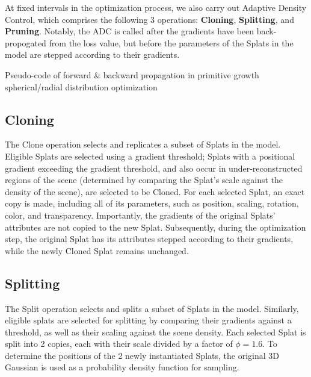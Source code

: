 \documentclass[11pt]{report}
\begin{document}
At fixed intervals in the optimization process, we also carry out Adaptive Density Control, which comprises the following 3 operations: \textbf{Cloning}, \textbf{Splitting}, and \textbf{Pruning}. Notably, the ADC is called after the gradients have been back-propogated from the loss value, but before the parameters of the Splats in the model are stepped according to their gradients.

\begin{center} %
    \begin{minipage}{0.75\textwidth}
            \begin{algorithm}[H]
                \caption{Pseudo-code of forward \& backward propagation in primitive growth spherical/radial distribution optimization}
                \label{alg:primitive_growth} 
                
            \end{algorithm}
    \end{minipage}
\end{center}

\subsection{Cloning}
The Clone operation selects and replicates a subset of Splats in the model. Eligible Splats are selected using a gradient threshold; Splats with a positional gradient exceeding the gradient threshold, and also occur in under-reconstructed regions of the scene (determined by comparing the Splat's scale against the density of the scene), are selected to be Cloned. For each selected Splat, an exact copy is made, including all of its parameters, such as position, scaling, rotation, color, and transparency. Importantly, the gradients of the original Splats' attributes are not copied to the new Splat. Subsequently, during the optimization step, the original Splat has its attributes stepped according to their gradients, while the newly Cloned Splat remains unchanged.

\subsection{Splitting}
The Split operation selects and splits a subset of Splats in the model. Similarly, eligible splats are selected for splitting by comparing their gradients against a threshold, as well as their scaling against the scene density. Each selected Splat is split into 2 copies, each with their scale divided by a factor of $\phi = 1.6$. To determine the positions of the 2 newly instantiated Splats, the original 3D Gaussian is used as a probability density function for sampling.
\end{document}
